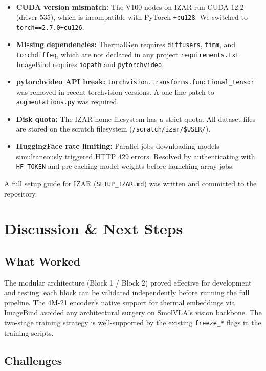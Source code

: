 \documentclass[10pt,conference,compsocconf]{IEEEtran}
\begin{document}
\begin{itemize}
    \item \textbf{CUDA version mismatch:} The V100 nodes on IZAR run CUDA 12.2 (driver 535), which is incompatible with PyTorch \texttt{+cu128}. We switched to \texttt{torch==2.7.0+cu126}.
    \item \textbf{Missing dependencies:} ThermalGen requires \texttt{diffusers}, \texttt{timm}, and \texttt{torchdiffeq}, which are not declared in any project \texttt{requirements.txt}. ImageBind requires \texttt{iopath} and \texttt{pytorchvideo}.
    \item \textbf{pytorchvideo API break:} \texttt{torchvision.transforms.functional\_tensor} was removed in recent torchvision versions. A one-line patch to \texttt{augmentations.py} was required.
    \item \textbf{Disk quota:} The IZAR home filesystem has a strict quota. All dataset files are stored on the scratch filesystem (\texttt{/scratch/izar/\$USER/}).
    \item \textbf{HuggingFace rate limiting:} Parallel jobs downloading models simultaneously triggered HTTP 429 errors. Resolved by authenticating with \texttt{HF\_TOKEN} and pre-caching model weights before launching array jobs.
\end{itemize}

A full setup guide for IZAR (\texttt{SETUP\_IZAR.md}) was written and committed to the repository.


\section{Discussion \& Next Steps}

\subsection{What Worked}

The modular architecture (Block 1 / Block 2) proved effective for development and testing: each block can be validated independently before running the full pipeline. The 4M-21 encoder's native support for thermal embeddings via ImageBind avoided any architectural surgery on SmolVLA's vision backbone. The two-stage training strategy is well-supported by the existing \texttt{freeze\_*} flags in the training scripts.

\subsection{Challenges}
\end{document}
